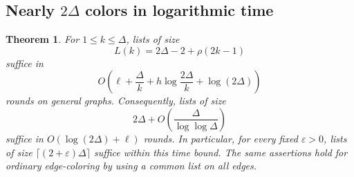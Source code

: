 \documentclass[11pt]{article}
\newtheorem{theorem}{Theorem}[section]
\theoremstyle{definition}
\theoremstyle{remark}
\begin{document}
\subsection{Nearly \texorpdfstring{$2\Delta$}{2 Delta} colors in logarithmic time}

\begin{theorem}\label{thm:generalbatching}
For $1\le k\le\Delta$, lists of size
\[
 L(k)=2\Delta-2+\rho(2k-1)
\]
suffice in
\[
 O\left(\ell+\frac{\Delta}{k}
       +h\log\frac{2\Delta}{k}+\log(2\Delta)\right)
\]
rounds on general graphs.
Consequently, lists of size
\[
 2\Delta+O\!\left(\frac{\Delta}{\log\log\Delta}\right)
\]
suffice in $O(\log(2\Delta)+\ell)$ rounds.  In particular, for every
fixed $\varepsilon>0$, lists of size $\lceil(2+\varepsilon)\Delta\rceil$
suffice within this time bound.  The same assertions hold for ordinary
edge-coloring by using a common list on all edges.
\end{theorem}
\end{document}
